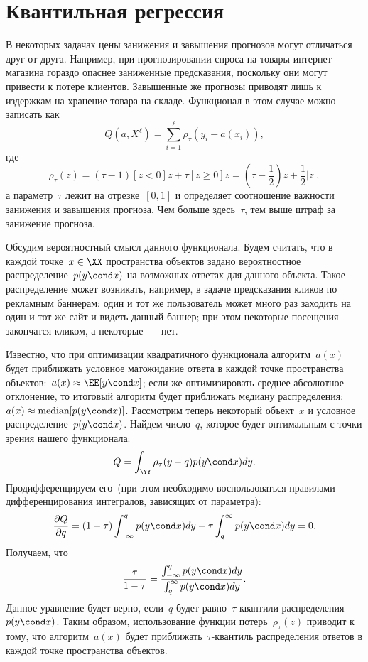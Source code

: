\documentclass[12pt,a4paper]{article}
\begin{document}
\section{Квантильная регрессия}

В некоторых задачах цены занижения и завышения прогнозов могут отличаться друг от друга.
Например, при прогнозировании спроса на товары интернет-магазина гораздо опаснее заниженные
предсказания, поскольку они могут привести к потере клиентов.
Завышенные же прогнозы приводят лишь к издержкам на хранение товара на складе.
Функционал в этом случае можно записать как
\[
    Q(a, X^\ell)
    =
    \sum_{i = 1}^{\ell}
        \rho_\tau(y_i - a(x_i)),
\]
где
\[
    \rho_\tau(z)
    =
    (\tau - 1) [z < 0] z
    +
    \tau [z \geq 0] z
    =
    (\tau - \frac{1}{2})z + \frac{1}{2} |z|,
\]
а параметр~$\tau$ лежит на отрезке~$[0, 1]$ и определяет
соотношение важности занижения и завышения прогноза.
Чем больше здесь~$\tau$, тем выше штраф за занижение прогноза.

Обсудим вероятностный смысл данного функционала.
Будем считать, что в каждой точке~$x \in \XX$ пространства объектов
задано вероятностное распределение~$p(y \cond x)$ на возможных ответах для данного объекта.
Такое распределение может возникать, например, в задаче предсказания кликов по рекламным баннерам:
один и тот же пользователь может много раз заходить на один и тот же сайт и видеть данный баннер;
при этом некоторые посещения закончатся кликом, а некоторые~--- нет.

Известно, что при оптимизации квадратичного функционала алгоритм~$a(x)$
будет приближать условное матожидание ответа в каждой точке пространства
объектов:~$a(x) \approx \EE [y \cond x]$;
если же оптимизировать среднее абсолютное отклонение, то итоговый алгоритм
будет приближать медиану распределения:~$a(x) \approx \text{median} [p(y \cond x)]$.
Рассмотрим теперь некоторый объект~$x$ и условное распределение~$p(y \cond x)$.
Найдем  число~$q$, которое будет оптимальным с точки зрения нашего функционала:
\[
    Q = \int_\YY \rho_\tau(y - q) p(y \cond x) dy.
\]
Продифференцируем его~(при этом необходимо воспользоваться правилами
дифференцирования интегралов, зависящих от параметра):
\[
    \frac{\partial Q}{\partial q}
    =
    (1 - \tau) \int_{-\infty}^{q} p(y \cond x) dy
    -
    \tau \int_{q}^{\infty} p(y \cond x) dy
    =
    0.
\]
Получаем, что
\[
    \frac{\tau}{1 - \tau}
    =
    \frac{
        \int_{-\infty}^{q} p(y \cond x) dy
    }{
        \int_{q}^{\infty} p(y \cond x) dy
    }.
\]
Данное уравнение будет верно, если~$q$ будет равно~$\tau$-квантили распределения~$p(y \cond x)$.
Таким образом, использование функции потерь~$\rho_\tau(z)$ приводит к тому,
что алгоритм~$a(x)$ будет приближать~$\tau$-квантиль распределения ответов в каждой точке
пространства объектов.
\end{document}
